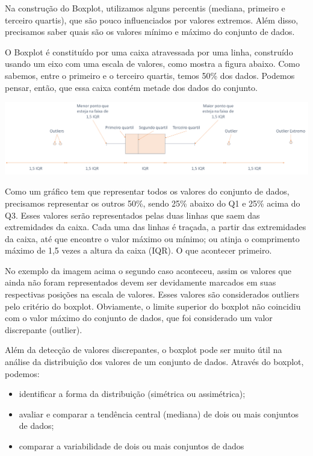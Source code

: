 \documentclass[
]{book}
\providecommand{\tightlist}{%
  \setlength{\itemsep}{0pt}\setlength{\parskip}{0pt}}
\begin{document}
Na construção do Boxplot, utilizamos alguns percentis (mediana, primeiro e terceiro quartis), que são pouco influenciados por valores extremos. Além disso, precisamos saber quais são os valores mínimo e máximo do conjunto de dados.

O Boxplot é constituído por uma caixa atravessada por uma linha, construído usando um eixo com uma escala de valores, como mostra a figura abaixo. Como sabemos, entre o primeiro e o terceiro quartis, temos 50\% dos dados. Podemos pensar, então, que essa caixa contém metade dos dados do conjunto.

\includegraphics{Boxplot exemplo.png}

Como um gráfico tem que representar todos os valores do conjunto de dados, precisamos representar os outros 50\%, sendo 25\% abaixo do Q1 e 25\% acima do Q3. Esses valores serão representados pelas duas linhas que saem das extremidades da caixa. Cada uma das linhas é traçada, a partir das extremidades da caixa, até que encontre o valor máximo ou mínimo; ou atinja o comprimento máximo de 1,5 vezes a altura da caixa (IQR). O que acontecer primeiro.

No exemplo da imagem acima o segundo caso aconteceu, assim os valores que ainda não foram representados devem ser devidamente marcados em suas respectivas posições na escala de valores. Esses valores são considerados outliers pelo critério do boxplot. Obviamente, o limite superior do boxplot não coincidiu com o valor máximo do conjunto de dados, que foi considerado um valor discrepante (outlier).

Além da detecção de valores discrepantes, o boxplot pode ser muito útil na análise da distribuição dos valores de um conjunto de dados. Através do boxplot, podemos:

\begin{itemize}
\tightlist
\item
  identificar a forma da distribuição (simétrica ou assimétrica);
\item
  avaliar e comparar a tendência central (mediana) de dois ou mais conjuntos de dados;
\item
  comparar a variabilidade de dois ou mais conjuntos de dados
\end{itemize}
\end{document}
